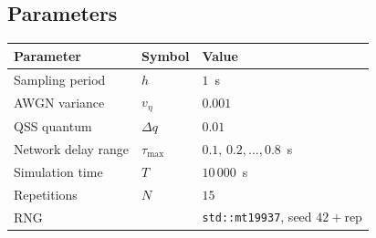 \subsection*{Parameters}

\begin{center}
\begin{tabular}{lll}
\hline
Parameter & Symbol & Value \\
\hline
Sampling period & $h$ & $1$~s \\
AWGN variance & $v_\eta$ & $0.001$ \\
QSS quantum & $\Delta q$ & $0.01$ \\
Network delay range & $\tau_{\max}$ & $0.1,\,0.2,\ldots,0.8$~s \\
Simulation time & $T$ & $10\,000$~s \\
Repetitions & $N$ & $15$ \\
RNG & & \texttt{std::mt19937}, seed $42+\text{rep}$ \\
\hline
\end{tabular}
\end{center}
